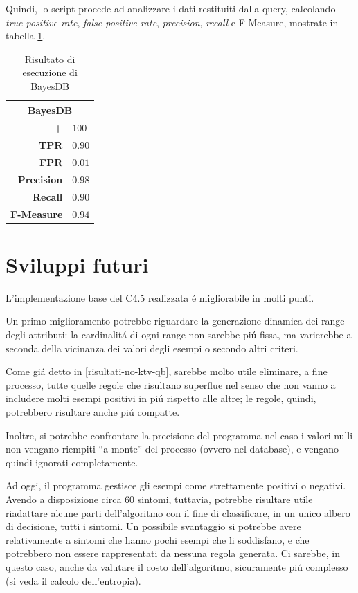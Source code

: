 \documentclass[preprint]{acm_proc_article-sp}
\begin{document}
Quindi, lo script procede ad analizzare i dati restituiti dalla query, calcolando \textit{true positive rate}, \textit{false positive rate}, \textit{precision}, \textit{recall} e F-Measure, mostrate in tabella \ref{table:risultati-bayesdb}.

\begin{table}[h]
\centering
\begin{tabular}{|r|l|} \hline
\multicolumn{2}{|c|}{\textbf{BayesDB}} \\ \hline \hline 
\textbf{+} & $100$ \\ \hline
\textbf{TPR} & $0.90$ \\ \hline
\textbf{FPR} & $0.01$ \\ \hline
\textbf{Precision} & $0.98$ \\ \hline
\textbf{Recall} & $0.90$ \\  \hline
\textbf{F-Measure} & $0.94$ \\
\hline\end{tabular}
\caption{Risultato di esecuzione di BayesDB}
\label{table:risultati-bayesdb}
\end{table}

\section{Sviluppi futuri}
\label{sviluppi-futuri}
L'implementazione base del C4.5 realizzata \'e migliorabile in molti punti.

Un primo miglioramento potrebbe riguardare la generazione dinamica dei range degli attributi: la cardinalit\'a di ogni range non sarebbe pi\'u fissa, ma varierebbe a seconda della vicinanza dei valori degli esempi o secondo altri criteri.

Come gi\'a detto in \ref{risultati-no-ktv-qb}, sarebbe molto utile eliminare, a fine processo, tutte quelle regole che risultano superflue nel senso che non vanno a includere molti esempi positivi in pi\'u rispetto alle altre; le regole, quindi, potrebbero risultare anche pi\'u compatte.

Inoltre, si potrebbe confrontare la precisione del programma nel caso i valori nulli non vengano riempiti ``a monte'' del processo (ovvero nel database), e vengano quindi ignorati completamente.

Ad oggi, il programma gestisce gli esempi come strettamente positivi o negativi. Avendo a disposizione circa $60$ sintomi, tuttavia, potrebbe risultare utile riadattare alcune parti dell'algoritmo con il fine di classificare, in un unico albero di decisione, tutti i sintomi. Un possibile svantaggio si potrebbe avere relativamente a sintomi che hanno pochi esempi che li soddisfano, e che potrebbero non essere rappresentati da nessuna regola generata. Ci sarebbe, in questo caso, anche da valutare il costo dell'algoritmo, sicuramente pi\'u complesso (si veda il calcolo dell'entropia).
\end{document}
